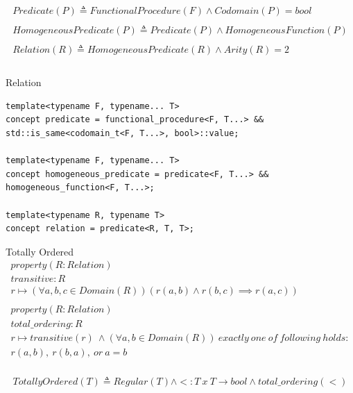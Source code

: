 \documentclass[10pt]{beamer}
\begin{document}
\begin{frame}
\begin{align*}
    Predicate(P) \triangleq FunctionalProcedure(F) \land Codomain(P) = bool\\\\
    HomogeneousPredicate(P) \triangleq Predicate(P) \land HomogeneousFunction(P) \\\\
    Relation(R) \triangleq HomogeneousPredicate(R) \land Arity(R) = 2\\\\
\end{align*}

\end{frame}


\begin{frame}[fragile]{Relation}
\begin{lstlisting}[style=cpp]
template<typename F, typename... T>
concept predicate = functional_procedure<F, T...> && std::is_same<codomain_t<F, T...>, bool>::value;

template<typename F, typename... T>
concept homogeneous_predicate = predicate<F, T...> && homogeneous_function<F, T...>;

template<typename R, typename T>
concept relation = predicate<R, T, T>;
\end{lstlisting}
\end{frame}


\begin{frame}{Totally Ordered}
    \begin{align*}
        property(R: Relation)\\
        transitive: R \\
                r \mapsto (\forall a,b,c \in Domain(R)) (r(a, b) \land r(b,c) \implies r(a, c))\\\\
        property(R: Relation)\\
        total\_ordering: R \\
                r \mapsto transitive(r)~\land(\forall a,b \in Domain(R))~exactly~one~of~following~holds:\\
            r(a, b),~r(b, a),~or~a = b\\
    \end{align*}

    \begin{align*}
        TotallyOrdered(T) \triangleq Regular(T) \land <: T~x~T \rightarrow bool \land total\_ordering(<)
    \end{align*}
\end{frame}
\end{document}

